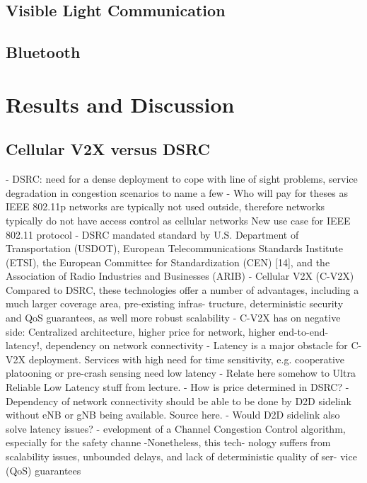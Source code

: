 \documentclass[conference,12pt,onecolumn]{IEEEtran}
\begin{document}
\subsection{Visible Light Communication}
\subsection{Bluetooth}

\section{Results and Discussion}
\subsection{Cellular V2X versus DSRC}
- DSRC: need for a dense deployment to cope with line of sight problems, service degradation in congestion scenarios to name a few \cite{machardy2018}
- Who will pay for theses as IEEE 802.11p networks are typically not used outside, therefore networks typically do not have access control as cellular networks \cite{machardy2018} New use case for IEEE 802.11 protocol
- DSRC mandated standard by U.S. Department of Transportation (USDOT), European Telecommunications Standards Institute (ETSI), the European Committee for Standardization (CEN) [14], and the Association of Radio Industries and Businesses (ARIB) \cite{machardy2018}
- Cellular V2X (C-V2X) Compared to DSRC, these technologies offer a number of advantages, including a much larger coverage area, pre-existing infras- tructure, deterministic security and QoS guarantees, as well more robust scalability \cite{machardy2018}
- C-V2X has on negative side: Centralized architecture, higher price for network, higher end-to-end-latency!, dependency on network connectivity \cite{machardy2018}
- Latency is a major obstacle for C-V2X deployment. Services with high need for time sensitivity, e.g. cooperative platooning or pre-crash sensing need low latency \cite{machardy2018}
- Relate here somehow to Ultra Reliable Low Latency stuff from lecture.
- How is price determined in DSRC?
- Dependency of network connectivity should be able to be done by D2D sidelink without eNB or gNB being available. Source here.
- Would D2D sidelink also solve latency issues?
- evelopment of a Channel Congestion Control
algorithm, especially for the safety channe \cite{kenney2011}
-Nonetheless, this tech- nology suffers from scalability issues, unbounded delays, and lack of deterministic quality of ser- vice (QoS) guarantees \cite{araniti2013}
\end{document}
